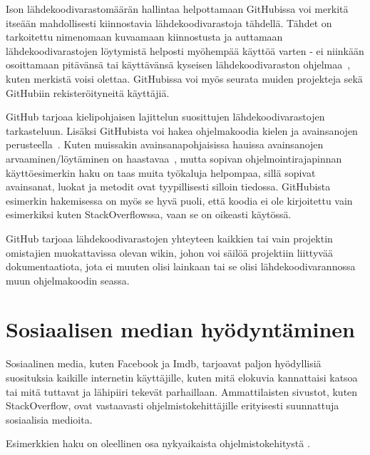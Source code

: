 \documentclass[finnish]{tktltiki2}
\theoremstyle{definition}
\theoremstyle{remark}
\begin{document}
Ison lähdekoodivarastomäärän hallintaa helpottamaan GitHubissa voi merkitä itseään mahdollisesti kiinnostavia lähdekoodivarastoja tähdellä. Tähdet on tarkoitettu nimenomaan kuvaamaan kiinnostusta ja auttamaan lähdekoodivarastojen löytymistä helposti myöhempää käyttöä varten - ei niinkään osoittamaan pitävänsä tai käyttävänsä kyseisen lähdekoodivaraston ohjelmaa~\cite{social-networking-meets-se}, kuten merkistä voisi olettaa. GitHubissa voi myös seurata muiden projekteja sekä GitHubiin rekisteröityneitä käyttäjiä.

GitHub tarjoaa kielipohjaisen lajittelun suosittujen lähdekoodivarastojen tarkasteluun. Lisäksi GitHubista voi hakea ohjelmakoodia kielen ja avainsanojen perusteella~\cite{social-networking-meets-se}. Kuten muissakin avainsanapohjaisissa hauissa avainsanojen arvaaminen/löytäminen on haastavaa~\cite{what-to-search-for}, mutta sopivan ohjelmointirajapinnan käyttöesimerkin haku on taas muita työkaluja helpompaa, sillä sopivat avainsanat, luokat ja metodit ovat tyypillisesti silloin tiedossa. GitHubista esimerkin hakemisessa on myös se hyvä puoli, että koodia ei ole kirjoitettu vain esimerkiksi kuten StackOverflowssa, vaan se on oikeasti käytössä.

GitHub tarjoaa lähdekoodivarastojen yhteyteen kaikkien tai vain projektin omistajien muokattavissa olevan wikin, johon voi säilöä projektiin liittyvää dokumentaatiota, jota ei muuten olisi lainkaan tai se olisi lähdekoodivarannossa muun ohjelmakoodin seassa.

\section{Sosiaalisen median hyödyntäminen}
Sosiaalinen media, kuten Facebook ja Imdb, tarjoavat paljon hyödyllisiä suosituksia kaikille internetin käyttäjille, kuten mitä elokuvia kannattaisi katsoa tai mitä tuttavat ja lähipiiri tekevät parhaillaan. Ammattilaisten sivustot, kuten StackOverflow, ovat vastaavasti ohjelmistokehittäjille erityisesti suunnattuja sosiaalisia medioita.

Esimerkkien haku on oleellinen osa nykyaikaista ohjelmistokehitystä \cite{example-overflow-social-media-for-code-recommendations}.
\end{document}
